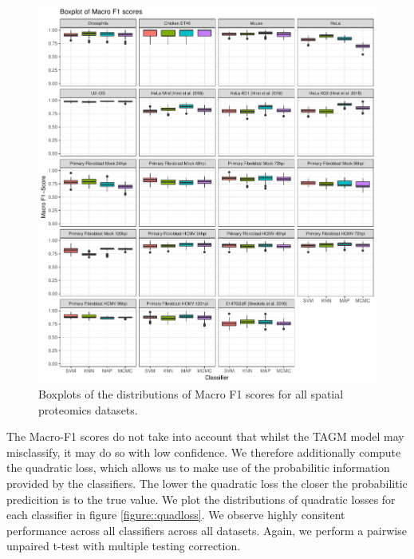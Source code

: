 \documentclass[12pt,english]{article}\usepackage[]{graphicx}\usepackage[]{color}
\makeatletter
\def\maxwidth{ %
  \ifdim\Gin@nat@width>\linewidth
    \linewidth
  \else
    \Gin@nat@width
  \fi
}
\newenvironment{knitrout}{}{} %
\makeatother
\begin{document}
\begin{figure}[ht]
  \centering
\begin{knitrout}
\color{fgcolor}
\includegraphics[width=\maxwidth]{figure/f1boxplots-1} 

\end{knitrout}
 \caption{Boxplots of the distributions of Macro F1 scores for all
   spatial proteomics datasets.}
  \label{figure::f1scores}
\end{figure}

\clearpage

The Macro-F1 scores do not take into account that whilst the TAGM
model may misclassify, it may do so with low confidence. We therefore
additionally compute the quadratic loss, which allows us to make use
of the probabilitic information provided by the classifiers. The lower
the quadratic loss the closer the probabilitic predicition is to the
true value. We plot the distributions of quadratic losses for each
classifier in figure \ref{figure::quadloss}. We observe highly
consitent performance across all classifiers across all
datasets. Again, we perform a pairwise unpaired t-test with multiple
testing correction.
\end{document}
